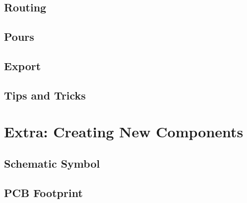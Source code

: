 \documentclass[12pt, oneside]{article}
\begin{document}
\subsection{Routing}
\subsection{Pours}
\subsection{Export}
\subsection{Tips and Tricks}

\section{Extra: Creating New Components}
\subsection{Schematic Symbol}

\subsection{PCB Footprint}
\end{document}
